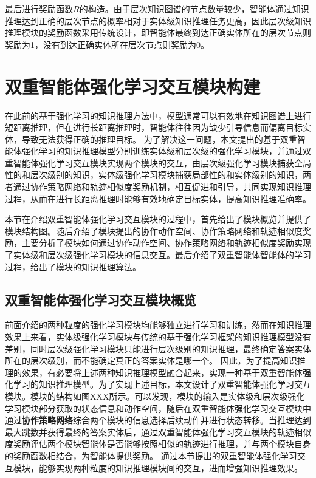 \documentclass[algorithmlist, AutoFakeBold, AutoFakeSlant, figurelist, tablelist, nomlist, masters]{seuthesix}
\begin{document}
最后进行奖励函数$R$的构造。由于层次知识图谱的节点数量较少，智能体通过知识推理达到正确的层次节点的概率相对于实体级知识推理任务更高，因此层次级知识推理模块的奖励函数采用传统设计，即智能体最终到达正确实体所在的层次节点则奖励为1，没有到达正确实体所在层次节点则奖励为0。

\section{双重智能体强化学习交互模块构建}
在此前的基于强化学习的知识推理方法中，模型通常可以有效地在知识图谱上进行短距离推理，但在进行长距离推理时，智能体往往因为缺少引导信息而偏离目标实体，导致无法获得正确的推理目标。
为了解决这一问题，本文提出的基于双重智能体强化学习的知识推理模型分别训练实体级和层次级的强化学习模块，并通过双重智能体强化学习交互模块实现两个模块的交互，由层次级强化学习模块捕获全局性的和层次级别的知识，实体级强化学习模块捕获局部性的和实体级别的知识，两者通过协作策略网络和轨迹相似度奖励机制，相互促进和引导，共同实现知识推理过程，从而在进行长距离推理时能够有效地确定目标实体，提高知识推理准确率。

本节在介绍双重智能体强化学习交互模块的过程中，首先给出了模块概览并提供了模块结构图。随后介绍了模块提出的协作动作空间、协作策略网络和轨迹相似度奖励，主要分析了模块如何通过协作动作空间、协作策略网络和轨迹相似度奖励实现了实体级和层次级强化学习模块的信息交互。最后介绍了双重智能体智能体的学习过程，给出了模块的知识推理算法。


\subsection{双重智能体强化学习交互模块概览}
前面介绍的两种粒度的强化学习模块均能够独立进行学习和训练，然而在知识推理效果上来看，实体级强化学习模块与传统的基于强化学习框架的知识推理模型没有差别，同时层次级强化学习模块只能进行层次级别的知识推理，最终确定答案实体所在的层次级别，而不能确定真正的答案实体是哪一个。
因此，为了提高知识推理的效果，有必要将上述两种知识推理模型融合起来，实现一种基于双重智能体强化学习的知识推理模型。为了实现上述目标，本文设计了双重智能体强化学习交互模块。模块的结构如图XXX所示。可以发现，模块的输入是实体级和层次级强化学习模块部分获取的状态信息和动作空间，随后在双重智能体强化学习交互模块中通过\textbf{协作策略网络}综合两个模块的信息选择后续动作并进行状态转移。当推理达到最大跳数并获得最终的答案实体后，通过双重智能体强化学习交互模块的轨迹相似度奖励评估两个模块智能体是否能够按照相似的轨迹进行推理，并与两个模块自身的奖励函数相结合，为智能体提供奖励。
通过本节提出的双重智能体强化学习交互模块，能够实现两种粒度的知识推理模块间的交互，进而增强知识推理效果。
\end{document}
